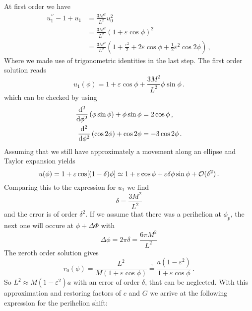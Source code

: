 At first order we have
\begin{equation}
\begin{split}
u_1^{\prime\prime}-1+u_1&=\frac{3M^2}{L^2}u_0^2\\
&=\frac{3M^2}{L^2}\left(1+\varepsilon\cos\phi\right)^2\\\
&=\frac{3M^2}{L^2}\left(1+\frac{\varepsilon^2}{2}+2\varepsilon\cos\phi+\frac{1}{2}\varepsilon^2\cos
2\phi\right)\,,
\end{split}
\end{equation}
Where we made use of trigonometric identities in the last step. 
The first order solution reads
\begin{equation}
u_1(\phi)=1+\varepsilon\cos\phi+\frac{3M^2}{L^2}\phi\sin\phi\,.
\end{equation}
which can be checked by using
\begin{align}
\dod[2]{}{\phi}(\phi\sin\phi)+\phi\sin\phi&=2\cos\phi\,,\\
\dod[2]{}{\phi}(\cos 2\phi)+\cos 2\phi&=-3\cos 2\phi\,.
\end{align}
Assuming that we still have approximately a movement along an ellipse and Taylor
expansion yields
\begin{equation}
u(\phi)=1+\varepsilon\cos[(1-\delta)\phi]
\simeq
1+\varepsilon\cos\phi
+\varepsilon\delta\phi\sin\phi+\mathcal{O}(\delta^2)\,.
\end{equation}
Comparing this to the expression for $u_1$ we find
\begin{equation}
\delta=\frac{3M^2}{L^2}
\end{equation}
and the error is of order $\delta^2$.
If we assume that there was a perihelion at $\phi_p$, the next one will occure
at $\phi+\Delta\Phi$ with 
\begin{equation}
\Delta\phi=2\pi\delta=\frac{6\pi M^2}{L^2}
\end{equation}
The zeroth order solution gives 
\begin{equation}
r_0(\phi)=\frac{L^2}{M(1+\varepsilon\cos\phi)}\stackrel{!}{=}
\frac{a(1-\varepsilon^2)}{1+\varepsilon\cos\phi}\,.
\end{equation}
So $L^2\approx M(1-\varepsilon^2)a$ with an error of order $\delta$, that can
be neglected.
With this approximation and restoring factors of $c$ and $G$ we arrive at the following
expression for the perihelion shift:
